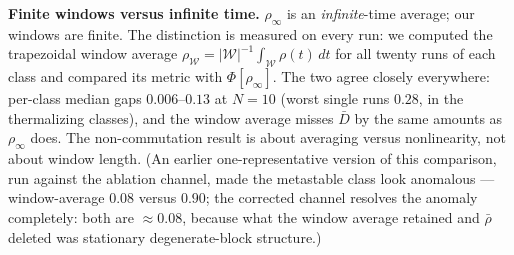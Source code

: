 \documentclass[a4paper,11pt,noarxiv]{quantumarticle}
\begin{document}
\textbf{Finite windows versus infinite time.} $\rho_\infty$ is an
\emph{infinite}-time average; our windows are finite. The distinction
is measured on every run: we computed the trapezoidal window average
$\rho_{\mathcal W} =
|\mathcal{W}|^{-1}\int_{\mathcal W}\rho(t)\,dt$ for all twenty runs of
each class and compared its metric with $\Phi[\rho_\infty]$. The two
agree closely everywhere: per-class median gaps
$0.006$--$0.13$ at $N{=}10$ (worst single runs $0.28$, in the
thermalizing classes), and the window average misses $\bar D$ by the
same amounts as $\rho_\infty$ does. The non-commutation result is
about averaging versus nonlinearity, not about window length. (An
earlier one-representative version of this comparison, run against the
ablation channel, made the metastable class look anomalous ---
window-average $0.08$ versus $0.90$; the corrected channel resolves
the anomaly completely: both are $\approx 0.08$, because what the
window average retained and $\bar\rho$ deleted was stationary
degenerate-block structure.)
\end{document}
